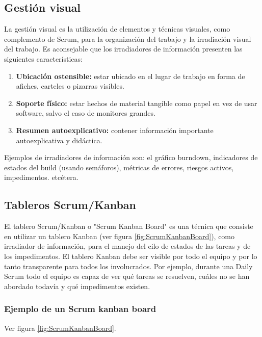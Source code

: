 \subsection{Gestión visual}

La gestión visual es la utilización de elementos y técnicas visuales, como complemento de Scrum, para la organización del trabajo y la irradiación visual del trabajo. Es aconsejable que los irradiadores de información presenten las siguientes características:

\begin{enumerate}

\item \textbf{Ubicación ostensible:} estar ubicado en el lugar de trabajo en forma de afiches, carteles o pizarras visibles.

\item \textbf{Soporte físico:} estar hechos de material tangible como papel en vez de usar software, salvo el caso de monitores grandes.

\item \textbf{Resumen autoexplicativo:} contener información importante autoexplicativa y didáctica.

\end{enumerate}

Ejemplos de irradiadores de información son: el gráfico burndown, indicadores de estados del build (usando semáforos), métricas de errores, riesgos activos, impedimentos. etcétera.

\subsection{Tableros Scrum/Kanban}

El tablero Scrum/Kanban o "Scrum Kanban Board" es una técnica que consiste en utilizar un tablero Kanban (ver figura \ref{fig:ScrumKanbanBoard}), como irradiador de información, para el manejo del cilo de estados de las tareas y de los impedimentos. El tablero Kanban debe ser visible por todo el equipo y por lo tanto transparente para todos los involucrados. Por ejemplo, durante una Daily Scrum todo el equipo es capaz de ver qué tareas se resuelven, cuáles no se han abordado todavía y qué impedimentos existen.

\subsubsection{Ejemplo de un Scrum kanban board}

Ver figura \ref{fig:ScrumKanbanBoard}.

